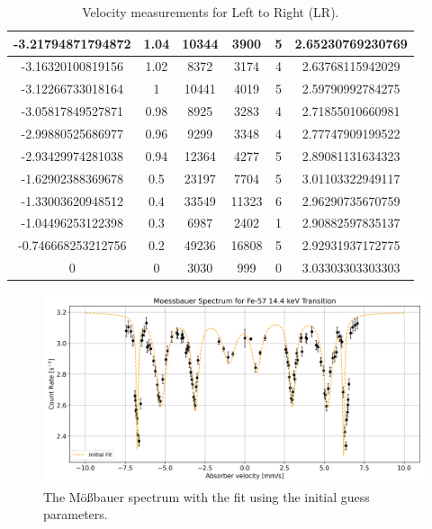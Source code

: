 \documentclass[a4paper]{report}
\numberwithin{equation}{section}
\begin{document}
\begin{table}[!ht]
\begin{tabular}{|c|c|c|c|c|c|}
        -3.21794871794872 & 1.04 & 10344 & 3900 & 5 & 2.65230769230769 \\ \hline
        -3.16320100819156 & 1.02 & 8372 & 3174 & 4 & 2.63768115942029 \\ \hline
        -3.12266733018164 & 1 & 10441 & 4019 & 5 & 2.59790992784275 \\ \hline
        -3.05817849527871 & 0.98 & 8925 & 3283 & 4 & 2.71855010660981 \\ \hline
        -2.99880525686977 & 0.96 & 9299 & 3348 & 4 & 2.77747909199522 \\ \hline
        -2.93429974281038 & 0.94 & 12364 & 4277 & 5 & 2.89081131634323 \\ \hline
        -1.62902388369678 & 0.5 & 23197 & 7704 & 5 & 3.01103322949117 \\ \hline
        -1.33003620948512 & 0.4 & 33549 & 11323 & 6 & 2.96290735670759 \\ \hline
        -1.04496253122398 & 0.3 & 6987 & 2402 & 1 & 2.90882597835137 \\ \hline
        -0.746668253212756 & 0.2 & 49236 & 16808 & 5 & 2.92931937172775 \\ \hline
        0 & 0 & 3030 & 999 & 0 & 3.03303303303303 \\ \hline
    \end{tabular}
    \caption{Velocity measurements for Left to Right (LR).}
\end{table}


\begin{figure}[htb!]
	\centering
	\includegraphics[width=0.8\columnwidth]{moess_spect_init.png}
	\caption{The M\"o{\ss}bauer spectrum with the fit using the initial guess parameters.}
	\label{fig:moess_spect_init}
\end{figure}

\end{document}
